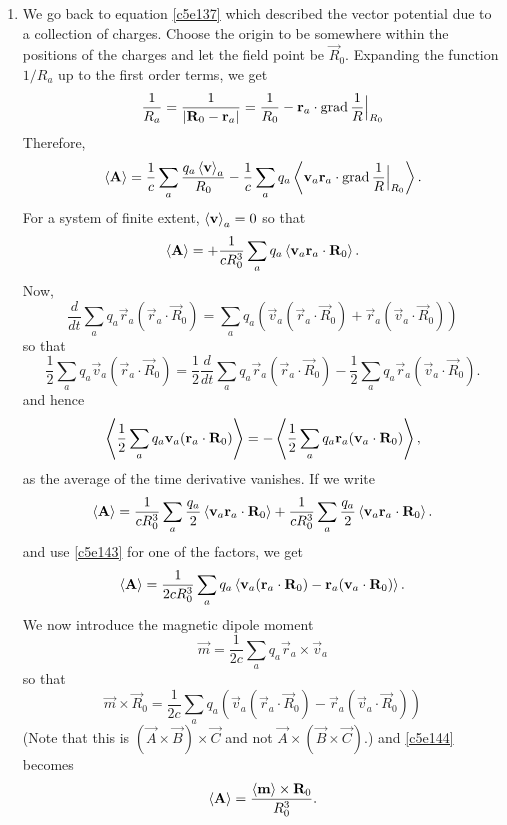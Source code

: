 \begin{enumerate}
\item We go back to equation \eqref{c5e137} which described the vector potential
due to a collection of charges. Choose the origin to be somewhere within the
positions of the charges and let the field point be $\vec{R}_0$. Expanding the
function $1/R_a$ up to the first order terms, we get
\[
\frac{1}{R_a} = \frac{1}{|\mathbf{R}_0 - \mathbf{r}_a|} = 
\frac{1}{R_0} - \mathbf{r}_a\cdot\operatorname{grad}\frac{1}{R}\Big|_{R_0}
\]
Therefore,
\begin{equation}\label{c5e141}
\left\langle{\mathbf{A}}\right\rangle = \frac{1}{c}\sum_a\frac{q_a\left\langle{\mathbf{v}}\right\rangle_a}{R_0} - 
\frac{1}{c}\sum_aq_a\left\langle{\mathbf{v}_a\mathbf{r}_a\cdot\operatorname{grad}\frac{1}{R}\Big|_{R_0}}\right\rangle.
\end{equation}
For a system of finite extent, $\left\langle{\mathbf{v}}\right\rangle_a = 0$ so that
\begin{equation}\label{c5e142}
\left\langle{\mathbf{A}}\right\rangle = +\frac{1}{cR_0^3}\sum_aq_a\left\langle{\mathbf{v}_a\mathbf{r}_a\cdot\mathbf{R}_0}\right\rangle.
\end{equation}
Now,
\[
\frac{d}{dt}\sum_a q_a\vec{r}_a(\vec{r}_a\cdot\vec{R}_0) = 
\sum_a q_a\left(\vec{v}_a(\vec{r}_a\cdot\vec{R}_0) + \vec{r}_a(\vec{v}_a\cdot\vec{R}_0)\right)
\]
so that
\[
\frac{1}{2}\sum_a q_a \vec{v}_a(\vec{r}_a\cdot\vec{R}_0) = 
\frac{1}{2}\frac{d}{dt}\sum_a q_a\vec{r}_a(\vec{r}_a\cdot\vec{R}_0) - 
\frac{1}{2}\sum_a q_a \vec{r}_a(\vec{v}_a\cdot\vec{R}_0).
\]
and hence
\begin{equation}\label{c5e143}
\left\langle{\frac{1}{2}\sum_a q_a \mathbf{v}_a(\mathbf{r}_a\cdot\mathbf{R}_0)}\right\rangle = 
-\left\langle{\frac{1}{2}\sum_a q_a \mathbf{r}_a(\mathbf{v}_a\cdot\mathbf{R}_0)}\right\rangle,
\end{equation}
as the average of the time derivative vanishes. If we write
\[
\left\langle{\mathbf{A}}\right\rangle = \frac{1}{cR_0^3}\sum_a\frac{q_a}{2}\left\langle{\mathbf{v}_a\mathbf{r}_a\cdot\mathbf{R}_0}\right\rangle
 + \frac{1}{cR_0^3}\sum_a\frac{q_a}{2}\left\langle{\mathbf{v}_a\mathbf{r}_a\cdot\mathbf{R}_0}\right\rangle.
\]
and use \eqref{c5e143} for one of the factors, we get
\begin{equation}\label{c5e144}
\left\langle{\mathbf{A}}\right\rangle = \frac{1}{2cR_0^3}\sum_aq_a\left\langle{\mathbf{v}_a(\mathbf{r}_a\cdot\mathbf{R}_0) - 
\mathbf{r}_a(\mathbf{v}_a\cdot\mathbf{R}_0)}\right\rangle.
\end{equation}
We now introduce the magnetic dipole moment
\begin{equation}\label{c5e145}
\vec{m} = \frac{1}{2c}\sum_a q_a\vec{r}_a \times \vec{v}_a
\end{equation}
so that
\[
\vec{m} \times \vec{R}_0 = \frac{1}{2c}
\sum_a q_a(\vec{v}_a(\vec{r}_a\cdot\vec{R}_0) - \vec{r}_a(\vec{v}_a\cdot\vec{R}_0))
\]
(Note that this is $(\vec{A} \times \vec{B})\times\vec{C}$ and not $\vec{A}\times
(\vec{B}\times\vec{C})$.) and \eqref{c5e144} becomes
\begin{equation}\label{c5e146}
\left\langle{\mathbf{A}}\right\rangle = \frac{\left\langle{\mathbf{m}}\right\rangle \times \mathbf{R}_0}{R_0^3}.
\end{equation}


\end{enumerate}
